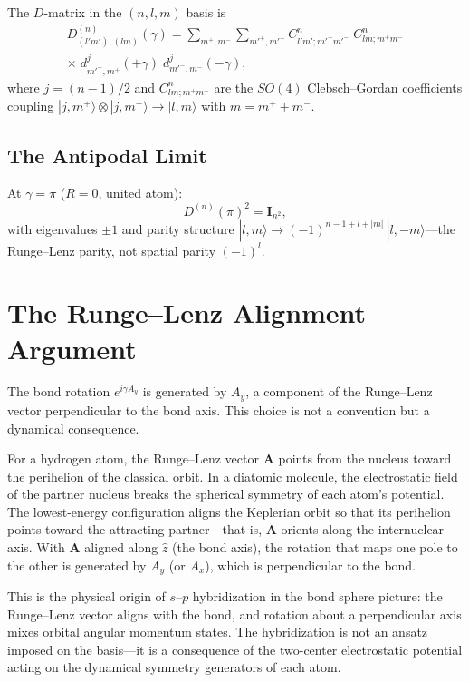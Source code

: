 \documentclass[aps,pra,twocolumn,superscriptaddress,longbibliography]{revtex4-2}
\begin{document}
The $D$-matrix in the $(n, l, m)$ basis is
\begin{multline}
D^{(n)}_{(l'm'),(lm)}(\gamma)
= \sum_{m^+, m^-} \sum_{m'^+, m'^-}
C^{n}_{l'm'; m'^+m'^-}\; C^{n}_{lm; m^+m^-} \\
\times\; d^{j}_{m'^+, m^+}(+\gamma)\;
d^{j}_{m'^-, m^-}(-\gamma),
\label{eq:D_nlm}
\end{multline}
where $j = (n-1)/2$ and $C^{n}_{lm; m^+m^-}$ are the $SO(4)$
Clebsch--Gordan coefficients coupling
$|j, m^+\rangle \otimes |j, m^-\rangle \to |l, m\rangle$ with
$m = m^+ + m^-$.

\subsection{The Antipodal Limit}

At $\gamma = \pi$ ($R = 0$, united atom):
\begin{equation}
D^{(n)}(\pi)^2 = \mathbf{I}_{n^2},
\label{eq:D_pi_squared}
\end{equation}
with eigenvalues $\pm 1$ and parity structure
$|l, m\rangle \to (-1)^{n-1+l+|m|}\, |l, -m\rangle$---the
Runge--Lenz parity, not spatial parity $(-1)^l$.


\section{The Runge--Lenz Alignment Argument}
\label{sec:runge_lenz}

The bond rotation $e^{i\gamma A_y}$ is generated by $A_y$, a component
of the Runge--Lenz vector perpendicular to the bond axis.  This choice
is not a convention but a dynamical consequence.

For a hydrogen atom, the Runge--Lenz vector $\mathbf{A}$ points from
the nucleus toward the perihelion of the classical orbit.  In a
diatomic molecule, the electrostatic field of the partner nucleus
breaks the spherical symmetry of each atom's potential.  The lowest-energy
configuration aligns the Keplerian orbit so that its perihelion points
toward the attracting partner---that is, $\mathbf{A}$ orients along
the internuclear axis.  With $\mathbf{A}$ aligned along $\hat{z}$ (the
bond axis), the rotation that maps one pole to the other is generated
by $A_y$ (or $A_x$), which is perpendicular to the bond.

This is the physical origin of $s$--$p$ hybridization in the bond sphere
picture: the Runge--Lenz vector aligns with the bond, and rotation about
a perpendicular axis mixes orbital angular momentum states.  The
hybridization is not an ansatz imposed on the basis---it is a consequence
of the two-center electrostatic potential acting on the dynamical
symmetry generators of each atom.
\end{document}
